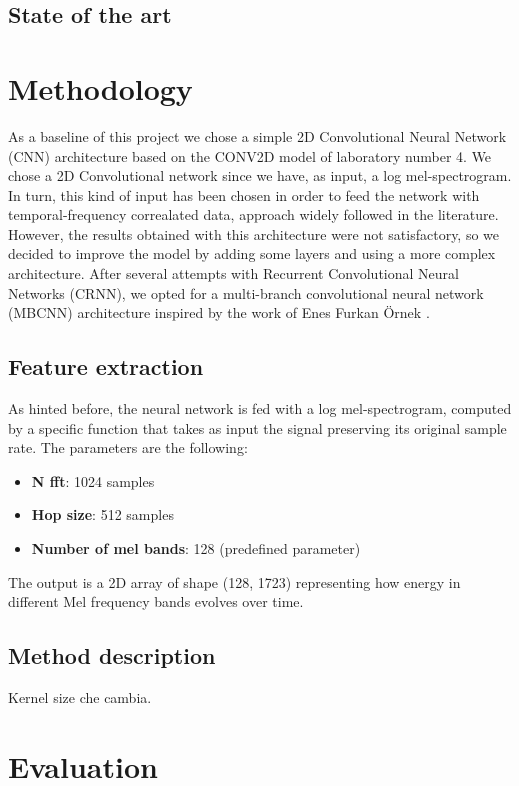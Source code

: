 \documentclass{article}
\begin{document}
\begin{sloppy}
\subsection{State of the art}
\label{sec:state_of_the_art}


\section{Methodology}
\label{sec:methodology}
As a baseline of this project we chose a simple 2D Convolutional Neural Network (CNN) architecture based on the CONV2D model of laboratory number 4.
We chose a 2D Convolutional network since we have, as input, a log mel-spectrogram. In turn, this kind of input has been chosen in order to feed the network with
temporal-frequency correalated data, approach widely followed in the literature. However, the results obtained with this architecture were not satisfactory,
so we decided to improve the model by adding some layers and using a more complex architecture. After several attempts with Recurrent Convolutional Neural Networks (CRNN),
we opted for a multi-branch convolutional neural network (MBCNN) architecture inspired by the work of Enes Furkan Örnek \cite{audio_classification_esc50}.

\subsection{Feature extraction}
\label{sec:feature_extraction}
As hinted before, the neural network is fed with a log mel-spectrogram, computed by a specific function that takes as input
the signal preserving its original sample rate. The parameters are the following:
\begin{itemize}
    \item \textbf{N fft}: 1024 samples
    \item \textbf{Hop size}: 512 samples
    \item \textbf{Number of mel bands}: 128 (predefined parameter)
\end{itemize}
The output is a 2D array of shape (128, 1723) representing how energy in different Mel frequency bands evolves over time.

\subsection{Method description}
\label{sec:method_description}
Kernel size che cambia.

\section{Evaluation}
\label{sec:evaluation}


\end{sloppy}
\end{document}

